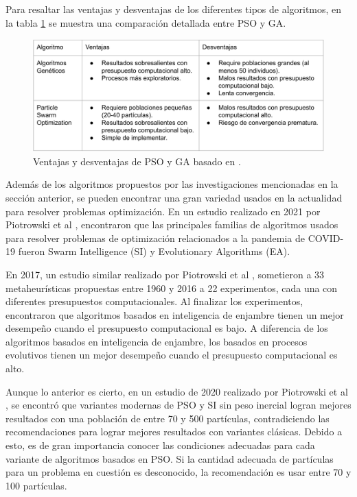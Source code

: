 \documentclass[letterpaper]{report}
\begin{document}
  Para resaltar las ventajas y desventajas de los diferentes tipos de
  algoritmos, en la tabla \ref{table:pso-ga-pros-cons} se muestra una
  comparación detallada entre PSO y GA.

  \begin{figure}[ht!]
    \includegraphics[width=\textwidth]{pso-ga-pros-cons.png}
    \caption{Ventajas y desventajas de PSO y GA basado en
      \cite{DE&PSOCov, SwarmVsEvol}.}
    \label{table:pso-ga-pros-cons}
  \end{figure}

  Además de los algoritmos propuestos por las investigaciones mencionadas en la 
  sección anterior, se pueden encontrar una gran variedad usados en la
  actualidad para 
  resolver problemas optimización. En un estudio realizado en 2021 por
  Piotrowski et al \cite{DE&PSOCov}, encontraron que las principales familias de
  algoritmos usados para resolver problemas de optimización relacionados a la 
  pandemia de COVID-19 fueron Swarm Intelligence (SI) y Evolutionary Algorithms
  (EA). 

  En 2017, un estudio similar realizado por Piotrowski et al \cite{SwarmVsEvol},
  sometieron a 33 metaheurísticas propuestas entre 1960 y 2016 a 22
  experimentos, cada una con diferentes presupuestos computacionales.
  Al finalizar los experimentos, encontraron que algoritmos basados en
  inteligencia de enjambre tienen un mejor desempeño cuando el presupuesto
  computacional es bajo. A diferencia de los algoritmos basados en inteligencia
  de enjambre, los basados en procesos evolutivos tienen un mejor desempeño
  cuando el presupuesto computacional es alto. 
  
  Aunque lo anterior es cierto, en un estudio de 2020 realizado por Piotrowski
  et al \cite{PSOPopulationSize}, se encontró que variantes modernas de PSO y
  SI sin peso inercial
  logran mejores resultados con una población de entre 70 y 500 partículas,
  contradiciendo las recomendaciones para lograr mejores resultados con
  variantes clásicas.
  Debido a esto, es de gran importancia conocer las condiciones adecuadas para
  cada variante de algoritmos basados en PSO. Si la cantidad adecuada de
  partículas para un problema en cuestión es desconocido, la recomendación es
  usar entre 70 y 100 partículas.
\end{document}
